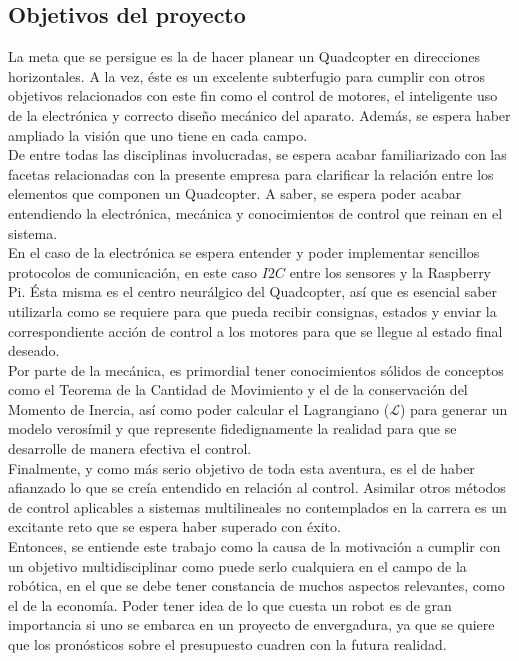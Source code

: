 \documentclass[twoside]{article}
\begin{document}
\subsection{Objetivos del proyecto}

La meta que se persigue es la de hacer planear un Quadcopter en direcciones horizontales. A la vez, éste es un excelente subterfugio para cumplir con otros objetivos relacionados con este fin como el control de motores, el inteligente uso de la electrónica y correcto diseño mecánico del aparato. Además, se espera haber ampliado la visión que uno tiene en cada campo. \\

De entre todas las disciplinas involucradas, se espera acabar familiarizado con las facetas relacionadas con la presente empresa para clarificar la relación entre los elementos que componen un Quadcopter.  A saber, se espera poder acabar entendiendo la electrónica, mecánica y conocimientos de control que reinan en el sistema. \\

En el caso de la electrónica se espera entender y poder implementar sencillos protocolos de comunicación, en este caso $I2C$ entre los sensores y la Raspberry Pi. Ésta misma es el centro neurálgico del Quadcopter, así que es esencial saber utilizarla como se requiere para que pueda recibir consignas, estados y enviar la correspondiente acción de control a los motores para que se llegue al estado final deseado. \\

Por parte de la mecánica, es primordial tener conocimientos sólidos de conceptos como el Teorema de la Cantidad de Movimiento y el de la conservación del Momento de Inercia, así como poder calcular el Lagrangiano ($\mathcal{L}$) para generar un modelo verosímil y que represente fidedignamente la realidad para que se desarrolle de manera efectiva el control. \\

Finalmente, y como más serio objetivo de toda esta aventura, es el de haber afianzado lo que se creía entendido en relación al control. Asimilar otros métodos de control aplicables a sistemas multilineales no contemplados en la carrera es un excitante reto que se espera haber superado con éxito. \\

Entonces, se entiende este trabajo como la causa de la motivación a cumplir con un objetivo multidisciplinar como puede serlo cualquiera en el campo de la robótica, en el que se debe tener constancia de muchos aspectos relevantes, como el de la economía. Poder tener idea de lo que cuesta un robot es de gran importancia si uno se embarca en un proyecto de envergadura, ya que se quiere que los pronósticos sobre el presupuesto cuadren con la futura realidad. 
\end{document}
